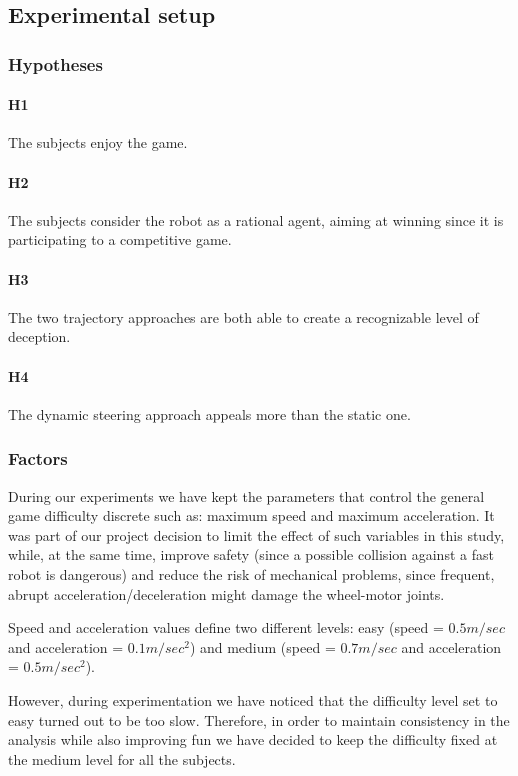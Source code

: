 
\subsection{Experimental setup}
\subsubsection{Hypotheses}

\paragraph{H1} The subjects enjoy the game.
\paragraph{H2} The subjects consider the robot as a rational agent, aiming at winning since it is participating to a competitive game.
\paragraph{H3} The two trajectory approaches are both able to create a recognizable level of deception. 
\paragraph{H4} The dynamic steering approach appeals more than the static one.

\subsubsection{Factors}
During our experiments we have kept the parameters that control the general game difficulty discrete such as: maximum speed and maximum acceleration. It was part of our project decision to limit the effect of such variables in this study, while, at the same time, improve safety (since a possible collision against a fast robot is dangerous) and reduce the risk of mechanical problems, since frequent, abrupt acceleration/deceleration might damage the wheel-motor joints.

Speed and acceleration values define two different levels: easy (speed = $0.5m/sec$ and acceleration = $0.1m/sec^2$) and medium (speed = $0.7m/sec$ and acceleration = $0.5m/sec^2$).

However, during experimentation we have noticed that the difficulty level set to easy turned out to be too slow. Therefore, in order to maintain consistency in the analysis while also improving fun we have decided to keep the difficulty fixed at the medium level for all the subjects.

